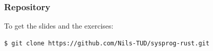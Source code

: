 \begin{frame}[fragile]
    \frametitle{Repository}

    \Large
    To get the slides and the exercises:
    \begin{lstlisting}[language=bash,basicstyle=\large\ttfamily]
    $ git clone https://github.com/Nils-TUD/sysprog-rust.git
    \end{lstlisting}
\end{frame}

